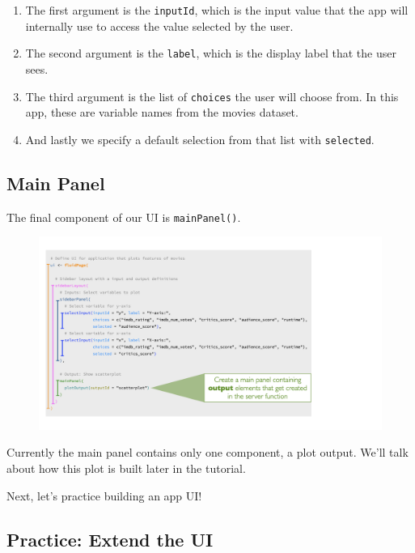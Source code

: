 \documentclass[
  letterpaper,
  DIV=11,
  numbers=noendperiod]{scrreprt}
\begin{document}
\begin{enumerate}
\def\labelenumi{\arabic{enumi}.}
\item
  The first argument is the \texttt{inputId}, which is the input value
  that the app will internally use to access the value selected by the
  user.
\item
  The second argument is the \texttt{label}, which is the display label
  that the user sees.
\item
  The third argument is the list of \texttt{choices} the user will
  choose from. In this app, these are variable names from the movies
  dataset.
\item
  And lastly we specify a default selection from that list with
  \texttt{selected}.
\end{enumerate}

\hypertarget{main-panel}{%
\subsection{Main Panel}\label{main-panel}}

The final component of our UI is \texttt{mainPanel()}.

\begin{figure}

{\centering \includegraphics[width=1\textwidth,height=\textheight]{./images/main-panel.png}

}

\end{figure}

Currently the main panel contains only one component, a plot output.
We'll talk about how this plot is built later in the tutorial.

Next, let's practice building an app UI!

\hypertarget{practice-extend-the-ui}{%
\subsection{Practice: Extend the UI}\label{practice-extend-the-ui}}
\end{document}
